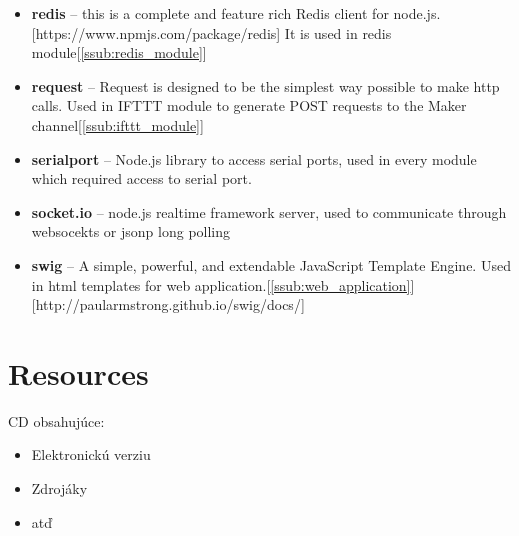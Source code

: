 \begin{itemize}
    \item \textbf{redis} -- this is a complete and feature rich Redis client for node.js.[https://www.npmjs.com/package/redis] It is used in redis module[\ref{ssub:redis_module}]
    \item \textbf{request} -- Request is designed to be the simplest way possible to make http calls. Used in IFTTT module to generate POST requests to the Maker channel[\ref{ssub:ifttt_module}]
    \item \textbf{serialport} -- Node.js library to access serial ports, used in every module which required access to serial port.
    \item \textbf{socket.io} -- node.js realtime framework server, used to communicate through websocekts or jsonp long polling
    \item \textbf{swig} -- A simple, powerful, and extendable JavaScript Template Engine. Used in html templates for web application.[\ref{ssub:web_application}][http://paularmstrong.github.io/swig/docs/]
\end{itemize}


\section*{Resources} %
\label{sec:resources}

CD obsahujúce:
\begin{itemize}
\item Elektronickú verziu
\item Zdrojáky
\item atď
\end{itemize}
